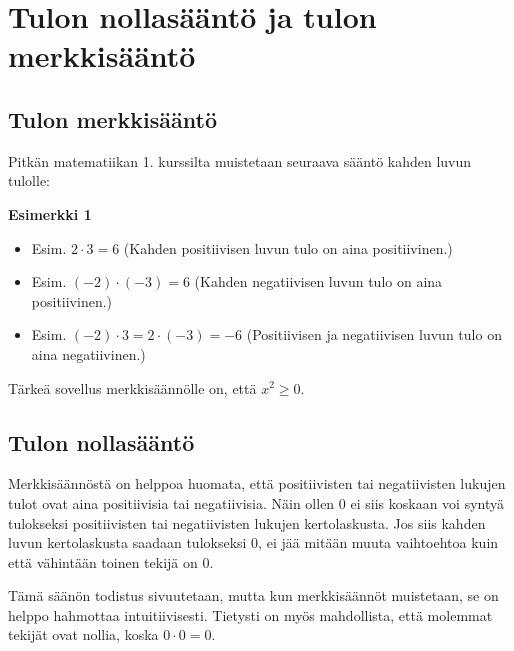 \chapter{Tulon nollasääntö ja tulon merkkisääntö}

\section{Tulon merkkisääntö}

Pitkän matematiikan 1. kurssilta muistetaan seuraava sääntö kahden luvun tulolle:


\textbf{Esimerkki 1}
\begin{itemize}
  \item Esim. $2\cdot 3 = 6$ (Kahden positiivisen luvun tulo on aina positiivinen.)
  \item Esim. $(-2)\cdot (-3) = 6$ (Kahden negatiivisen luvun tulo on aina positiivinen.)
  \item Esim. $(-2)\cdot 3 = 2\cdot (-3) = -6$ (Positiivisen ja negatiivisen luvun tulo on aina negatiivinen.)
\end{itemize}

Tärkeä sovellus merkkisäännölle on, että $x^2 \geq 0$.

\section{Tulon nollasääntö}

Merkkisäännöstä on helppoa huomata, että positiivisten tai negatiivisten
lukujen tulot ovat aina positiivisia tai negatiivisia. Näin ollen $0$ ei siis koskaan
voi syntyä tulokseksi positiivisten tai negatiivisten lukujen kertolaskusta. Jos siis kahden luvun
kertolaskusta saadaan tulokseksi $0$, ei jää mitään muuta vaihtoehtoa kuin että vähintään toinen tekijä on $0$.


Tämä säänön todistus sivuutetaan, mutta kun merkkisäännöt muistetaan, se
on helppo hahmottaa intuitiivisesti. Tietysti on myös mahdollista, että molemmat
tekijät ovat nollia, koska $0\cdot 0=0$.

